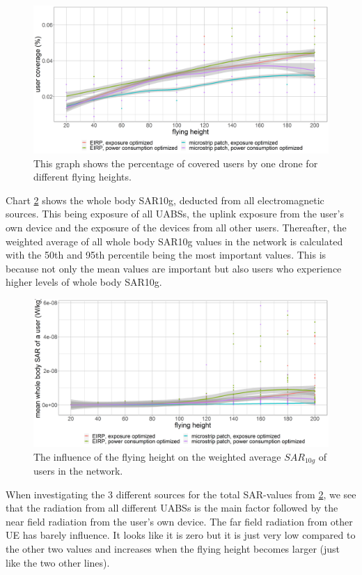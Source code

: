 \begin{figure}[h!]
  \includegraphics[width=\textwidth]{../results/s2/fhvscov.png}
  \caption{This graph shows the percentage of covered users by one drone for different flying heights.}
  \label{fig:s2fhvscov}
\end{figure}

Chart \ref{fig:s2fhvssar} shows the whole body SAR10g, deducted from all electromagnetic sources. This being exposure of all \gls{UABS}s,
 the uplink exposure from the user’s own device and the exposure of the devices from all other users. 
 Thereafter, the weighted average of all whole body SAR10g values in the network is calculated with the 50th and 95th percentile 
 being the most important values. This is because not only the mean values are important but also users who experience higher 
 levels of whole body SAR10g.


\begin{figure}[h!]
  \includegraphics[width=\textwidth]{../results/s2/fhvssar.png}
  \caption{The influence of the flying height on the weighted average $SAR_{10g}$ of users in the network.}
  \label{fig:s2fhvssar}
\end{figure}

When investigating the 3 different sources for the total \gls{SAR}-values from \ref{fig:s2fhvssar}, we see 
that the radiation from all different \gls{UABS}s is the main factor followed by the near field radiation from the user's own device.
The far field radiation from other \gls{UE} has barely influence. 
It looks like it is zero but it is just very low compared to the other two values and increases when the flying height becomes larger (just like the two other lines).

